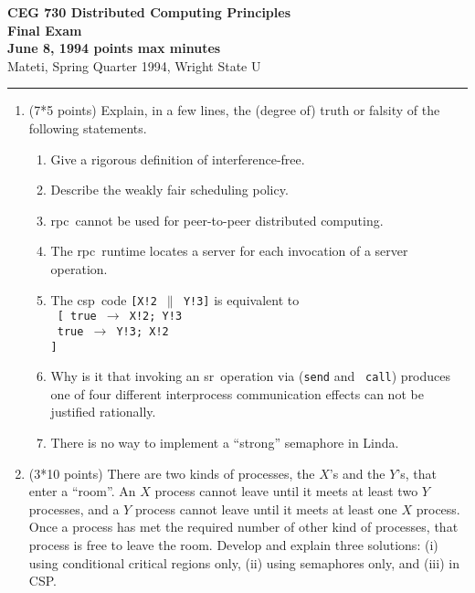 \def\fat{\framebox[1mm]{\rule{0mm}{2mm}}}
\def\CSP{{\sc csp}}
\def\RPC{{\sc rpc}}
\def\SR{{\sc sr}}
\def\co{{\bf co}}
\def\oc{{\bf oc}}
\def\pa{{$\parallel$}}
\def\lb{\langle}
\def\rb{\rangle}
\def\ra{$\rightarrow$}
\def\await{{\bf await}}
\parindent=0pt
\pagestyle{empty}



{\bf CEG 
\large \bf 730 Distributed Computing Principles\\[5pt]
\large Final Exam\\[10pt]
June 8, 1994  points max  minutes\\
}
\bigskip
{Mateti,  Spring Quarter 1994, Wright State U}\\[-5pt]
\hrule

\begin{enumerate}

\item (7*5 points)
Explain, in a few lines, the (degree of) truth or falsity of the
following statements.

\begin{enumerate}
\item Give a rigorous definition of interference-free.

\item Describe the weakly fair scheduling policy.

\item
\RPC\ cannot be used for peer-to-peer distributed computing.

\item
The \RPC\ runtime locates a server for each invocation
of a server operation.

\item
The \CSP\ code {\tt [X!2 \pa\ Y!3]} is equivalent to \\
{\tt
[  true \ra\ X!2; Y!3\\
\fat\ true \ra\ Y!3; X!2\\
]}

\item
Why is it that invoking an \SR\ operation via ({\tt send} and {\tt
call}) produces one of four different interprocess communication
effects can not be justified rationally.

\item
There is no way to implement a ``strong'' semaphore in Linda.

\end{enumerate}

\item (3*10 points)
There are two kinds of processes, the $X$'s and the $Y$'s, that enter
a ``room''.  An $X$ process cannot leave until it meets at least two
$Y$ processes, and a $Y$ process cannot leave until it meets at least
one $X$ process.  Once a process has met the required number of other
kind of processes, that process is free to leave the room.  Develop
and explain three solutions: (i) using conditional critical regions
only, (ii) using semaphores only, and (iii) in CSP.


\end{enumerate}
